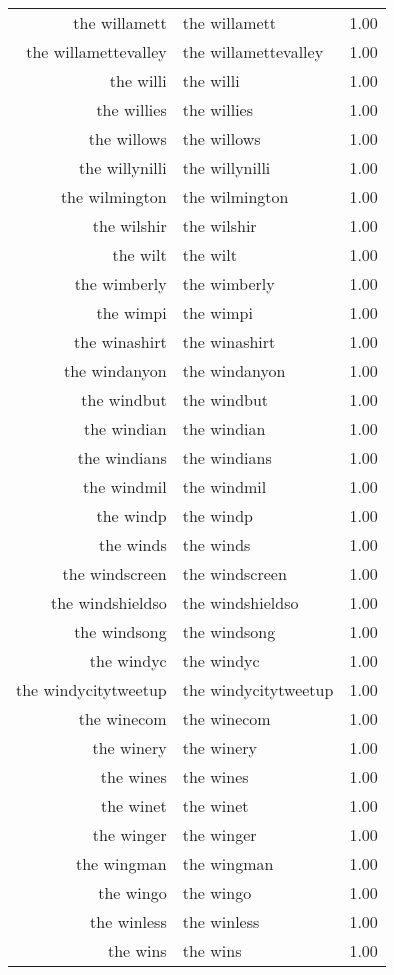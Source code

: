 \begin{table}[ht]
\begin{tabular}{rlr}
  the willamett & the willamett & 1.00 \\ 
  the willamettevalley & the willamettevalley & 1.00 \\ 
  the willi & the willi & 1.00 \\ 
  the willies & the willies & 1.00 \\ 
  the willows & the willows & 1.00 \\ 
  the willynilli & the willynilli & 1.00 \\ 
  the wilmington & the wilmington & 1.00 \\ 
  the wilshir & the wilshir & 1.00 \\ 
  the wilt & the wilt & 1.00 \\ 
  the wimberly & the wimberly & 1.00 \\ 
  the wimpi & the wimpi & 1.00 \\ 
  the winashirt & the winashirt & 1.00 \\ 
  the windanyon & the windanyon & 1.00 \\ 
  the windbut & the windbut & 1.00 \\ 
  the windian & the windian & 1.00 \\ 
  the windians & the windians & 1.00 \\ 
  the windmil & the windmil & 1.00 \\ 
  the windp & the windp & 1.00 \\ 
  the winds & the winds & 1.00 \\ 
  the windscreen & the windscreen & 1.00 \\ 
  the windshieldso & the windshieldso & 1.00 \\ 
  the windsong & the windsong & 1.00 \\ 
  the windyc & the windyc & 1.00 \\ 
  the windycitytweetup & the windycitytweetup & 1.00 \\ 
  the winecom & the winecom & 1.00 \\ 
  the winery & the winery & 1.00 \\ 
  the wines & the wines & 1.00 \\ 
  the winet & the winet & 1.00 \\ 
  the winger & the winger & 1.00 \\ 
  the wingman & the wingman & 1.00 \\ 
  the wingo & the wingo & 1.00 \\ 
  the winless & the winless & 1.00 \\ 
  the wins & the wins & 1.00 \\ 

\end{tabular}
\end{table}

